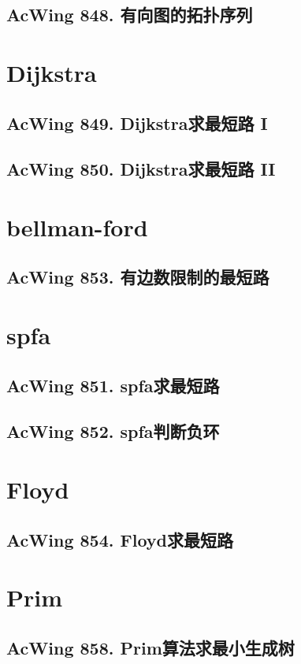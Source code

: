 \subsection{AcWing 848. 有向图的拓扑序列}

\section{Dijkstra}
\subsection{AcWing 849. Dijkstra求最短路 I}
\subsection{AcWing 850. Dijkstra求最短路 II}

\section{bellman-ford}
\subsection{AcWing 853. 有边数限制的最短路}

\section{spfa}
\subsection{AcWing 851. spfa求最短路}
\subsection{AcWing 852. spfa判断负环}

\section{Floyd}
\subsection{AcWing 854. Floyd求最短路}

\section{Prim}
\subsection{AcWing 858. Prim算法求最小生成树}

